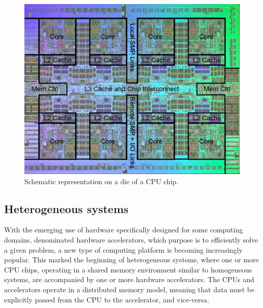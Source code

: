 \begin{figure}[!htp]
	\begin{center}
		\includegraphics[scale=4]{../../common/img/cpu_scheme.jpg}
		\caption{Schematic representation on a die of a CPU chip.}
		\label{fig:CPUChip}
	\end{center}
\end{figure}

\subsection{Heterogeneous systems}
\label{HeterogeneousSystems}

With the emerging use of hardware specifically designed for some computing domains, denominated hardware accelerators, which purpose is to efficiently solve a given problem, a new type of computing platform is becoming increasingly popular. This marked the beginning of heterogeneous systems, where one or more CPU chips, operating in a shared memory environment similar to homogeneous systems, are accompanied by one or more hardware accelerators. The CPUs and accelerators operate in a distributed memory model, meaning that data must be explicitly passed from the CPU to the accelerator, and vice-versa.

